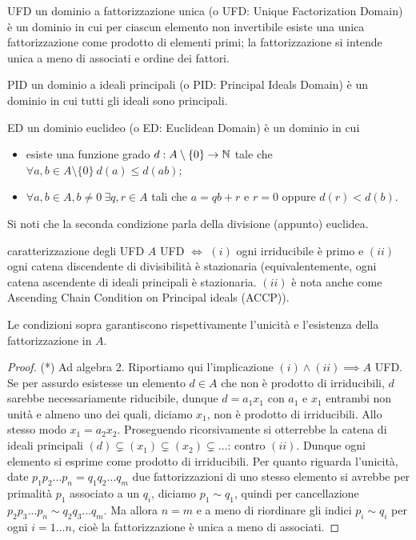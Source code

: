 \begin{definition}{UFD}
    un dominio a fattorizzazione unica (o UFD: Unique Factorization Domain) è un dominio in cui per ciascun elemento non invertibile esiste una unica fattorizzazione come prodotto di elementi primi; la fattorizzazione si intende unica a meno di associati e ordine dei fattori.
\end{definition}
\begin{definition}{PID}
     un dominio a ideali principali (o PID: Principal Ideals Domain) è un dominio in cui tutti gli ideali sono principali.
\end{definition}
\begin{definition}{ED}
    un dominio euclideo (o ED: Euclidean Domain) è un dominio in cui 
    \begin{itemize}
        \item esiste una funzione grado $d : A \setminus \{0\} \rightarrow \mathbb{N}$ tale che $\forall a,b\in A\setminus \{0\}\ d(a) \leq d(ab)$;
        \item  $\forall a,b\in A, b\neq 0 \ \exists q,r \in A$ tali che $a = qb + r$ e $r = 0$ oppure $d(r) < d(b)$.
    \end{itemize}
    Si noti che la seconda condizione parla della divisione (appunto) euclidea.
\end{definition}
\begin{theorem}{caratterizzazione degli UFD}
    $A$ UFD $\iff$ $(i)$ ogni irriducibile è primo e $(ii)$ ogni catena discendente di divisibilità è stazionaria (equivalentemente, ogni catena ascendente di ideali principali è stazionaria. $(ii)$ è nota anche come Ascending Chain Condition on Principal ideals (ACCP)).

    Le condizioni sopra garantiscono rispettivamente l'unicità e l'esistenza della fattorizzazione in $A$.
\end{theorem}
\begin{proof}
    (*) Ad algebra 2. Riportiamo qui l'implicazione $(i) \land (ii) \implies A$ UFD. Se per assurdo esistesse un elemento $d \in A$ che non è prodotto di irriducibili, $d$ sarebbe necessariamente riducibile, dunque $d = a_1 x_1$ con $a_1$ e $x_1$ entrambi non unità e almeno uno dei quali, diciamo $x_1$, non è prodotto di irriducibili. Allo stesso modo $x_1 = a_2 x_2$. Proseguendo ricorsivamente si otterrebbe la catena di ideali principali $(d) \subsetneq (x_1) \subsetneq (x_2) \subsetneq \dots$: contro $(ii)$. Dunque ogni elemento si esprime come prodotto di irriducibili. Per quanto riguarda l'unicità, date $p_1 p_2 \dots p_n = q_1 q_2 \dots q_m$ due fattorizzazioni di uno stesso elemento si avrebbe per primalità $p_1$ associato a un $q_i$, diciamo $p_1 \sim q_1$, quindi per cancellazione $p_2 p_3 \dots p_n \sim q_2 q_3 \dots q_m$. Ma allora $n = m$ e a meno di riordinare gli indici $p_i \sim q_i$ per ogni $i = 1 \dots n$, cioè la fattorizzazione è unica a meno di associati.
\end{proof}
